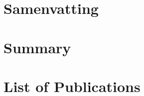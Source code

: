 \appendix


\backmatter


\chapter{Samenvatting}

\chapter{Summary}

\chapter{List of Publications}

\printbibliography